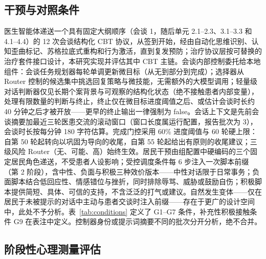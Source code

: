 \documentclass[11pt,a4paper]{article}
\begin{document}
\subsection*{干预与对照条件}

医生智能体递送一个具有固定大纲顺序（会谈 1，随后单元 2.1--2.3、3.1--3.3 和 4.1--4.4）的 12 次会谈结构化 CBT 协议，从签到开始，经由自动化思维识别、认知歪曲标记、苏格拉底式重构和行为激活，直到复发预防；治疗协议层按可替换的治疗套件接口设计，本研究实现并评估其中 CBT 主链。会谈内部控制委托给本地组件：会谈任务规划器每轮单调更新微目标（从无到部分到完成）；选择器从 Router 控制的候选集中挑选回复策略与微技能，无需额外的大模型调用；轻量级对话判断器仅见长期个案背景与可观察的结构化状态（绝不接触患者内部变量），处理有限数量的判断与终止，终止仅在微目标进度阈值之后、或估计会谈时长约 40 分钟之后才被开放——更早的终止输出一律强制为 false。会话上下文是先前会谈摘要加最近三轮医患交流的滚动窗口（窗口长度属运行配置，报告批次为 3），会谈时长按每分钟 180 字符估算。完成门控采用 60\% 进度阈值与 60 轮硬上限：自第 50 轮起转向以巩固为导向的收尾，自第 55 轮起给出有原则的收尾建议；三级风险 Router（无、可能、高）始终生效。居民干预由组配置中硬编码的三个固定居民角色递送，不受患者人设影响；受控调度条件每 6 步注入一次脚本前缀（第 2 阶段），含中性、负面与积极三种效价版本——中性对话限于日常事务；负面脚本结合低回应性、情感错位与挫折，同时排除辱骂、威胁或鼓励自伤；积极脚本提供简短、具体、可信的支持，不含泛泛的打气或建议。自然发生变体——仅在居民于未被提示的对话中主动与患者交谈时注入前缀——存在于更广的设计空间中，此处不予分析。表~\ref{tab:conditions} 定义了 G1--G7 条件，补充性积极接触条件 G9 在表注中定义。控制器身份或提示词摘要不同的批次分开分析，绝不合并。

\subsection*{阶段性心理测量评估}
\end{document}
